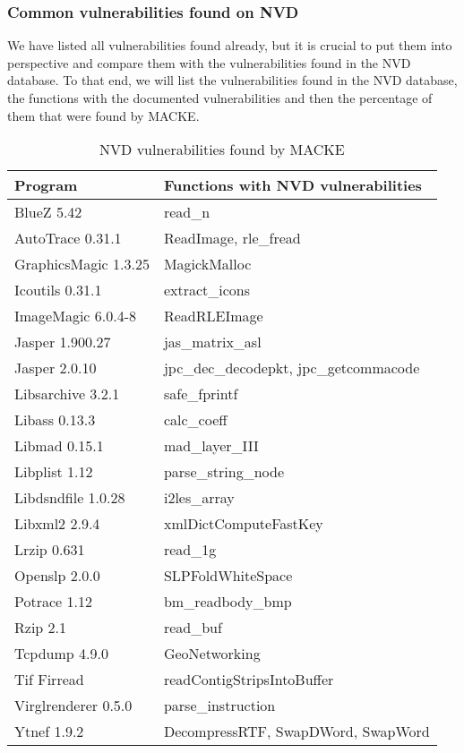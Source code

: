 \subsubsection{Common vulnerabilities found on NVD}

We have listed all vulnerabilities found already, but it is crucial to put them into perspective and compare them with the vulnerabilities found in the NVD database. To that end, we will list the vulnerabilities found in the NVD database, the functions with the documented vulnerabilities and then the percentage of them that were found by MACKE.

\begin{table}[H]
	\centering
	\caption{NVD vulnerabilities found by MACKE}
	\begin{tabular}{ |p{4cm}||p{10cm}|  }
		\hline
		Program & Functions with NVD vulnerabilities\\
		\hline
		BlueZ 5.42   & read\_n \\ 
		AutoTrace 0.31.1 &   ReadImage, rle\_fread  \\
		GraphicsMagic 1.3.25 & MagickMalloc  \\
		Icoutils 0.31.1    & extract\_icons  \\
		ImageMagic 6.0.4-8    & ReadRLEImage  \\
		Jasper 1.900.27    & jas\_matrix\_asl  \\
		Jasper 2.0.10    & jpc\_dec\_decodepkt, jpc\_getcommacode  \\
		Libsarchive 3.2.1    & safe\_fprintf \\
		Libass 0.13.3    & calc\_coeff \\
		Libmad 0.15.1    & mad\_layer\_III \\
		Libplist 1.12    & parse\_string\_node \\
		Libdsndfile 1.0.28    & i2les\_array \\
		Libxml2 2.9.4    & xmlDictComputeFastKey\\
		Lrzip 0.631    & read\_1g \\
		Openslp 2.0.0    & SLPFoldWhiteSpace \\
		Potrace 1.12    & bm\_readbody\_bmp  \\
		Rzip 2.1    & read\_buf  \\
		Tcpdump 4.9.0    & GeoNetworking \\
		Tif Firread    & readContigStripsIntoBuffer \\
		Virglrenderer 0.5.0    & parse\_instruction \\
		Ytnef 1.9.2    & DecompressRTF, SwapDWord, SwapWord \\
		\hline
	\end{tabular}
\end{table}

